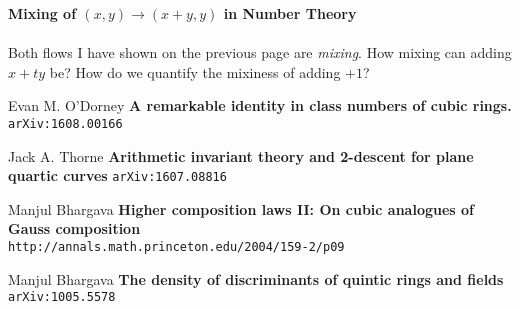 \documentclass[12pt]{article}
\begin{document}
\noindent \textbf{Mixing of $(x,y) \to (x+y,y)$ in Number Theory} \\ \\
Both flows I have shown on the previous page are \textit{mixing}.  How mixing can adding $x + ty$ be?  How do we quantify the mixiness of adding $+1$?

\newpage

\selectfont \fontsize{12}{10}\selectfont

\begin{thebibliography}{}

\item Evan M. O'Dorney	 \textbf{A remarkable identity in class numbers of cubic rings.} \texttt{arXiv:1608.00166}

\item Jack A. Thorne \textbf{Arithmetic invariant theory and 2-descent for plane quartic curves} \texttt{arXiv:1607.08816}

\item Manjul Bhargava \textbf{Higher composition laws II: On cubic analogues of Gauss composition} \\  \texttt{http://annals.math.princeton.edu/2004/159-2/p09}

\item Manjul Bhargava \textbf{The density of discriminants of quintic rings and fields}  
\texttt{arXiv:1005.5578}


\end{thebibliography}
\end{document}

